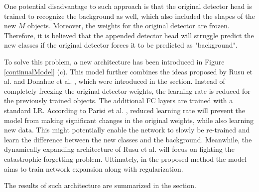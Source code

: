 One potential disadvantage to such approach is that the original detector head is trained to recognize the background as well, which also included the shapes of the new $M$ objects. Moreover, the weights for the original detector are frozen. Therefore, it is believed that the appended detector head will struggle predict the new classes if the original detector forces it to be predicted as "background". 

To solve this problem, a new architecture has been introduced in Figure \ref{continualModel} (c). This model further combines the ideas proposed by Rusu et al. \cite{Rusu2016} and Donahue et al. \cite{Donahue2013}, which were introduced in the  section. Instead of completely freezing the original detector weights, the learning rate is reduced for the previously trained objects. The additional FC layers are trained with a standard LR.  According to Parisi et al. \cite{Parisi2018}, reduced learning rate will prevent the model from making significant changes in the original weights, while also learning new data. This might potentially enable the network to slowly be re-trained and learn the difference between the new classes and the background. Meanwhile, the dynamically expanding architecture of Rusu et al. \cite{Rusu2016} will focus on fighting the catastrophic forgetting problem. Ultimately, in the proposed method the model aims to train network expansion along with regularization. 

The results of such architecture are summarized in the  section. 


